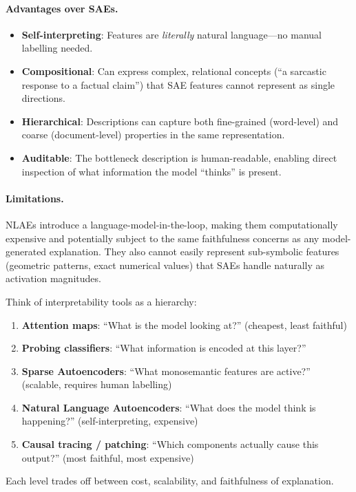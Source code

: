 \paragraph{Advantages over SAEs.}
\label{advantages-over-saes.}

\begin{itemize}
  \item \textbf{Self-interpreting}: Features are \emph{literally} natural language---no manual labelling needed.
  \item \textbf{Compositional}: Can express complex, relational concepts (``a sarcastic response to a factual claim'') that SAE features cannot represent as single directions.
  \item \textbf{Hierarchical}: Descriptions can capture both fine-grained (word-level) and coarse (document-level) properties in the same representation.
  \item \textbf{Auditable}: The bottleneck description is human-readable, enabling direct inspection of what information the model ``thinks'' is present.
\end{itemize}

\paragraph{Limitations.}
\label{limitations.}

NLAEs introduce a language-model-in-the-loop, making them computationally expensive and potentially subject to the same faithfulness concerns as any model-generated explanation. They also cannot easily represent sub-symbolic features (geometric patterns, exact numerical values) that SAEs handle naturally as activation magnitudes.

\begin{intuitionbox}
Think of interpretability tools as a hierarchy:

\begin{enumerate}
  \item \textbf{Attention maps}: ``What is the model looking at?'' (cheapest, least faithful)
  \item \textbf{Probing classifiers}: ``What information is encoded at this layer?''
  \item \textbf{Sparse Autoencoders}: ``What monosemantic features are active?'' (scalable, requires human labelling)
  \item \textbf{Natural Language Autoencoders}: ``What does the model think is happening?'' (self-interpreting, expensive)
  \item \textbf{Causal tracing / patching}: ``Which components actually cause this output?'' (most faithful, most expensive)
\end{enumerate}

Each level trades off between cost, scalability, and faithfulness of explanation.
\end{intuitionbox}

